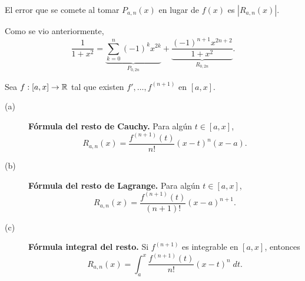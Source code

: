 \begin{observation}
\normalfont El error que se comete al tomar $\displaystyle P_{a,n}\left(x\right) $ en lugar de $\displaystyle f\left(x\right) $ es $\displaystyle \left|R_{a,n}\left(x\right)\right| $.
\end{observation}
\begin{eg}
\normalfont Como se vio anteriormente, 
\[\frac{1}{1 + x^{2}} = \underbrace{\sum^{n}_{k=0}\left(-1\right)^{k}x^{2k}}_{P_{0,2n}} + \underbrace{\frac{\left(-1\right)^{n+1}x^{2n+2}}{1 + x^{2}}}_{R_{0,2n}} .\]
\end{eg}
\begin{ftheorem}
	\normalfont Sea $\displaystyle f : \left[a,x\right] \to \mathbb{R} $ tal que existen $\displaystyle f', \ldots, f^{\left(n+1\right)} $ en $\displaystyle \left[a,x\right]  $.
	\begin{description}
		\item[(a)] \textbf{Fórmula del resto de Cauchy.} Para algún $\displaystyle t \in \left[a,x\right]  $,
		\[ R_{a,n}\left(x\right) = \frac{f^{\left(n+1\right)} \left(t\right)}{n!}\left(x-t\right)^{n}\left(x-a\right) .\]
	\item[(b)] \textbf{Fórmula del resto de Lagrange.} Para algún $\displaystyle t \in \left[a,x\right]  $, 
		\[R_{a,n}\left(x\right) = \frac{f^{\left(n+1\right)}\left(t\right)}{\left(n+1\right)!} \left(x - a\right)^{n+1}.\]
	\item[(c)] \textbf{Fórmula integral del resto.} Si $\displaystyle f^{\left(n+1\right)} $ es integrable en $\displaystyle \left[a,x\right]  $, entonces
		\[R_{a,n}\left(x\right) = \int^{x}_{a} \frac{f^{\left(n+1\right)}\left(t\right)}{n!}\left(x-t\right)^{n} \; dt .\]
	\end{description}
\end{ftheorem}
